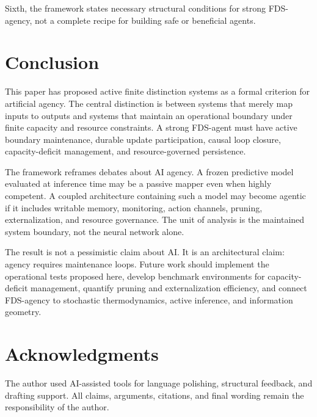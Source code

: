 \documentclass[10pt,a4paper,twocolumn,aps,prl]{revtex4-2}
\begin{document}
Sixth, the framework states necessary structural conditions for strong FDS-agency, not a complete recipe for building safe or beneficial agents.

\section{Conclusion}

This paper has proposed active finite distinction systems as a formal criterion for artificial agency. The central distinction is between systems that merely map inputs to outputs and systems that maintain an operational boundary under finite capacity and resource constraints. A strong FDS-agent must have active boundary maintenance, durable update participation, causal loop closure, capacity-deficit management, and resource-governed persistence.

The framework reframes debates about AI agency. A frozen predictive model evaluated at inference time may be a passive mapper even when highly competent. A coupled architecture containing such a model may become agentic if it includes writable memory, monitoring, action channels, pruning, externalization, and resource governance. The unit of analysis is the maintained system boundary, not the neural network alone.

The result is not a pessimistic claim about AI. It is an architectural claim: agency requires maintenance loops. Future work should implement the operational tests proposed here, develop benchmark environments for capacity-deficit management, quantify pruning and externalization efficiency, and connect FDS-agency to stochastic thermodynamics, active inference, and information geometry.

\section*{Acknowledgments}

The author used AI-assisted tools for language polishing, structural feedback, and drafting support. All claims, arguments, citations, and final wording remain the responsibility of the author.

\appendix
\end{document}
